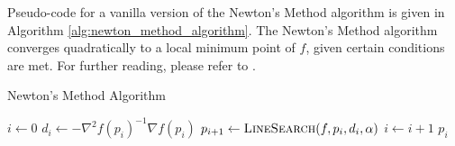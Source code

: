 Pseudo-code for a vanilla version of the Newton's Method algorithm is given in Algorithm \ref{alg:newton_method_algorithm}. The Newton's Method algorithm converges quadratically to a local minimum point of $f$, given certain conditions are met. For further reading, please refer to \cite{Nocedal2006Numerical}.
\begin{algorithm}[ht]
  \caption{Newton's Method Algorithm}
  \label{alg:newton_method_algorithm}
  \begin{algorithmic}[1]
      \State $i \leftarrow 0$
        \State $d_i \leftarrow -\nabla^2 f\left(p_i\right)^{-1} \nabla f\left(p_i\right)$
        \State $p_{i+1} \leftarrow \Call{LineSearch}{f, p_i, d_i, \alpha}$
        \State $i \leftarrow i + 1$
      \EndWhile
      \State \Return $p_i$
    \EndFunction
  \end{algorithmic}
\end{algorithm}